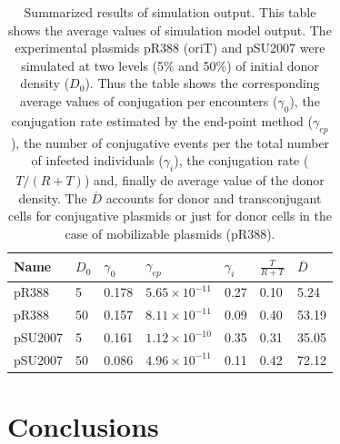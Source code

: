 \begin{table}
\centering
\begin{tabular}{lllllll}
\toprule
Name 	& $D_0$ & $\gamma_0$ & $\gamma_{ep}$ & $\gamma_i$ & $\frac{T}{R+T}$ &  $\overline{D}$ \\
\midrule 
pR388 	& 5		&  0.178 &  $5.65\times10^{-11}$ & 0.27 & 0.10 & 5.24 	\\ 
pR388 	& 50 	&  0.157 &  $8.11\times10^{-11}$ & 0.09 & 0.40 & 53.19 	\\ 
pSU2007	& 5 	&  0.161 &  $1.12\times10^{-10}$ & 0.35 & 0.31 & 35.05 	\\ 
pSU2007	& 50 	&  0.086 &  $4.96\times10^{-11}$ & 0.11 & 0.42 & 72.12 	\\ 
\bottomrule
\end{tabular}
\caption[Simulation results]{\label{tbl:results} Summarized results of simulation output. This table shows the average values of simulation model output.  The experimental plasmids pR388 (oriT) and pSU2007 were simulated at two levels (5\% and 50\%) of initial donor density ($D_0$). Thus the table shows the corresponding average values of conjugation per encounters ($\gamma_0$), the conjugation rate estimated by the end-point method ($\gamma_{ep}$), the  number of conjugative events per the total number of infected individuals ($\gamma_i$), the conjugation rate ($T/(R+T)$) and, finally de average value of the donor density. The $\overline{D}$ accounts for donor and transconjugant cells for conjugative plasmids or just for donor cells in the case of mobilizable plasmids (pR388).}
\end{table}


\section{Conclusions}